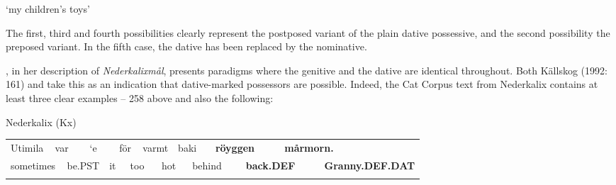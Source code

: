 \begin{styleTranslation}
‘my children’s toys’

\end{styleTranslation}

\begin{styleBodyTextFirst}
The first, third and fourth possibilities clearly represent the postposed variant of the plain dative possessive, and the second possibility the preposed variant. In the fifth case, the dative has been replaced by the nominative.  

\end{styleBodyTextFirst}

\begin{styleBodytextC}
\citet{Rutberg1924}, in her description of \textit{Nederkalixmål}, presents paradigms where the genitive and the dative are identical throughout. Both Källskog (1992: 161) and \citet[42]{Delsing2003a} take this as an indication that dative-marked possessors are possible. Indeed, the Cat Corpus text from Nederkalix contains at least three clear examples – 258 above and also the following:

\end{styleBodytextC}

\begin{listWWNumileveli}
\item {}

\begin{styleExample}
Nederkalix (Kx)

\end{styleExample}

\end{listWWNumileveli}

\begin{tabular}{llllllllllllllll}
\lsptoprule
Utimila & \multicolumn{2}{l}{var

} & \multicolumn{2}{l}{‘e

} & \multicolumn{2}{l}{för

} & \multicolumn{2}{l}{varmt

} & \multicolumn{2}{l}{baki

} & \multicolumn{2}{l}{{\bfseries röyggen}

} & \multicolumn{2}{l}{{\bfseries mårmorn.}

} & \\
\multicolumn{2}{l}{sometimes

} & \multicolumn{2}{l}{be.PST

} & \multicolumn{2}{l}{it

} & \multicolumn{2}{l}{too

} & \multicolumn{2}{l}{hot

} & \multicolumn{2}{l}{behind

} & \multicolumn{2}{l}{{\bfseries back.DEF}

} & \multicolumn{2}{l}{{\bfseries Granny.DEF.DAT}

}\\
\lspbottomrule
\end{tabular}

